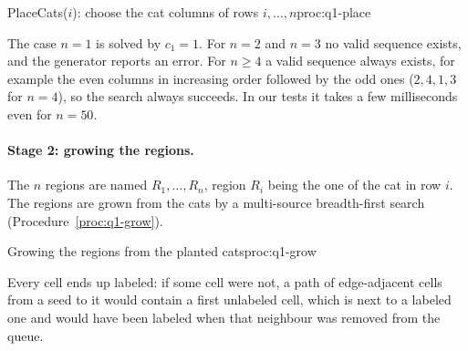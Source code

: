 \begin{pseudo}{PlaceCats($i$): choose the cat columns of rows $i,\ldots,n$}{proc:q1-place}
\end{pseudo}

The case $n=1$ is solved by $c_1=1$. For $n=2$ and $n=3$ no valid sequence exists, and the generator reports an error. For $n\ge4$ a valid sequence always exists, for example the even columns in increasing order followed by the odd ones ($2,4,1,3$ for $n=4$), so the search always succeeds. In our tests it takes a few milliseconds even for $n=50$.

\paragraph{Stage 2: growing the regions.}
The $n$ regions are named $R_1,\ldots,R_n$, region $R_i$ being the one of the cat in row $i$. The regions are grown from the cats by a multi-source breadth-first search (Procedure~\ref{proc:q1-grow}).

\begin{pseudo}{Growing the regions from the planted cats}{proc:q1-grow}
\end{pseudo}

Every cell ends up labeled: if some cell were not, a path of edge-adjacent cells from a seed to it would contain a first unlabeled cell, which is next to a labeled one and would have been labeled when that neighbour was removed from the queue.

